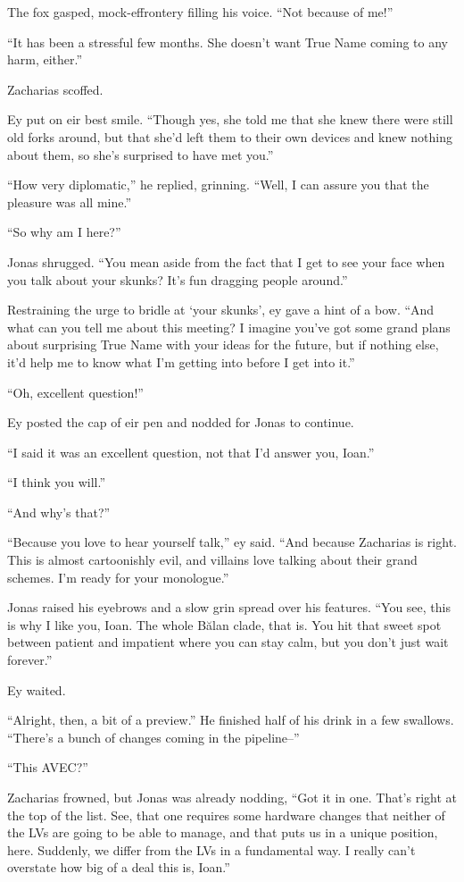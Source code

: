 The fox gasped, mock-effrontery filling his voice. ``Not because of me!''

``It has been a stressful few months. She doesn't want True Name coming to any harm, either.''

Zacharias scoffed.

Ey put on eir best smile. ``Though yes, she told me that she knew there were still old forks around, but that she'd left them to their own devices and knew nothing about them, so she's surprised to have met you.''

``How very diplomatic,'' he replied, grinning. ``Well, I can assure you that the pleasure was all mine.''

``So why am I here?''

Jonas shrugged. ``You mean aside from the fact that I get to see your face when you talk about your skunks? It's fun dragging people around.''

Restraining the urge to bridle at `your skunks', ey gave a hint of a bow. ``And what can you tell me about this meeting? I imagine you've got some grand plans about surprising True Name with your ideas for the future, but if nothing else, it'd help me to know what I'm getting into before I get into it.''

``Oh, excellent question!''

Ey posted the cap of eir pen and nodded for Jonas to continue.

``I said it was an excellent question, not that I'd answer you, Ioan.''

``I think you will.''

``And why's that?''

``Because you love to hear yourself talk,'' ey said. ``And because Zacharias is right. This is almost cartoonishly evil, and villains love talking about their grand schemes. I'm ready for your monologue.''

Jonas raised his eyebrows and a slow grin spread over his features. ``You see, this is why I like you, Ioan. The whole Bălan clade, that is. You hit that sweet spot between patient and impatient where you can stay calm, but you don't just wait forever.''

Ey waited.

``Alright, then, a bit of a preview.'' He finished half of his drink in a few swallows. ``There's a bunch of changes coming in the pipeline--''

``This AVEC?''

Zacharias frowned, but Jonas was already nodding, ``Got it in one. That's right at the top of the list. See, that one requires some hardware changes that neither of the LVs are going to be able to manage, and that puts us in a unique position, here. Suddenly, we differ from the LVs in a fundamental way. I really can't overstate how big of a deal this is, Ioan.''


